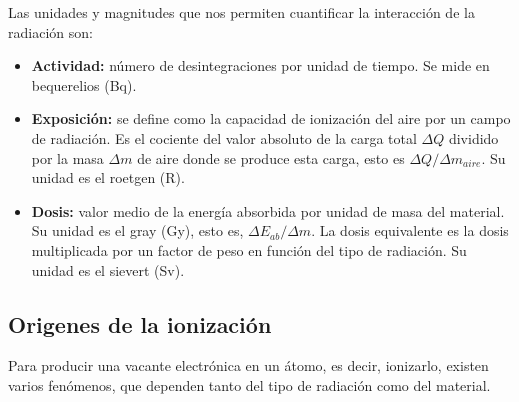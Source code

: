 Las unidades y magnitudes que nos permiten cuantificar la interacción de la radiación son: 

\begin{itemize}
    \item \textbf{Actividad:} número de desintegraciones por unidad de tiempo. Se mide en bequerelios (Bq).
    \item \textbf{Exposición:} se define como la capacidad de ionización del aire por un campo de radiación. Es el cociente del valor absoluto de la carga total $\Delta Q$ dividido por la masa $\Delta m$ de aire donde se produce esta carga, esto es $\Delta Q/\Delta m_{aire}$. Su unidad es el roetgen (R). 
    \item \textbf{Dosis:} valor medio de la energía absorbida por unidad de masa del material. Su unidad es el gray (Gy), esto es, $\Delta E_{ab}/\Delta m$. La dosis equivalente es la dosis multiplicada por un factor de peso en función del tipo de radiación. Su unidad es el sievert (Sv).
\end{itemize}

\subsection{Origenes de la ionización}

Para producir una vacante electrónica en un átomo, es decir, ionizarlo, existen varios fenómenos, que dependen tanto del tipo de radiación como del material. 

